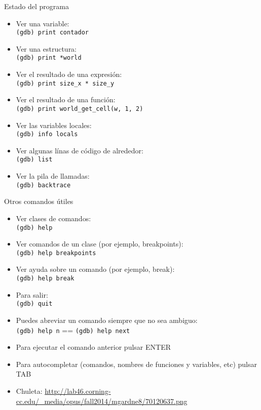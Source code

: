 \documentclass{mybeamer}
\begin{document}
\begin{framesubsec}{Estado del programa}
	\begin{itemize}
		\item Ver una variable:\\
			\texttt{(gdb) print contador}
		\item Ver una estructura:\\
			\texttt{(gdb) print *world}
		\item Ver el resultado de una expresión:\\
			\texttt{(gdb) print size\_x * size\_y}
		\item Ver el resultado de una función:\\
			\texttt{(gdb) print world\_get\_cell(w, 1, 2)}
		\item Ver las variables locales:\\
			\texttt{(gdb) info locals}
		\item Ver algunas línas de código de alrededor:\\
			\texttt{(gdb) list}
		\item Ver la pila de llamadas:\\
			\texttt{(gdb) backtrace}
	\end{itemize}
\end{framesubsec}

\begin{framesubsec}{Otros comandos útiles}
	\begin{itemize}
		\item Ver clases de comandos:\\
			\texttt{(gdb) help}
		\item Ver comandos de un clase (por ejemplo, breakpoints):\\
			\texttt{(gdb) help breakpoints}
		\item Ver ayuda sobre un comando (por ejemplo, break):\\
			\texttt{(gdb) help break}
		\item Para salir:\\
			\texttt{(gdb) quit}
		\item Puedes abreviar un comando siempre que no sea ambiguo:\\
			\texttt{(gdb) help n} == \texttt{(gdb) help next}
		\item Para ejecutar el comando anterior pulsar ENTER
		\item Para autocompletar (comandos, nombres de funciones y
			variables, etc) pulsar TAB
		\item Chuleta: \url{http://lab46.corning-cc.edu/_media/opus/fall2014/mgardne8/70120637.png}
	\end{itemize}
\end{framesubsec}
\end{document}
